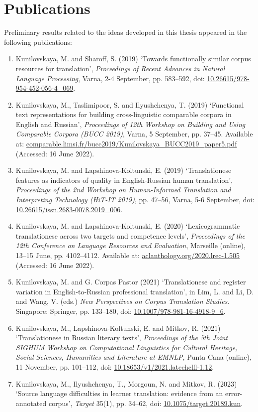 \section{\label{sec:papers}Publications}
Preliminary results related to the ideas developed in this thesis appeared in the following publications:
\begin{enumerate}\compresslist{}
	\item Kunilovskaya, M. and Sharoff, S. (2019) `Towards functionally similar corpus resources for translation', \textit{Proceedings of Recent Advances in Natural Language Processing}, Varna, 2-4 September, pp. 583--592, doi: \url{10.26615/978-954-452-056-4\_069}.
	\item Kunilovskaya, M., Taslimipoor, S. and Ilyushchenya, T. (2019) `Functional text representations for building cross-linguistic comparable corpora in English and Russian', \textit{Proceedings of 12th Workshop on Building and Using Comparable Corpora (BUCC 2019)}, Varna, 5 September, pp. 37--45. Available at: \url{comparable.limsi.fr/bucc2019/Kunilovskaya\_BUCC2019\_paper5.pdf} (Accessed: 16 June 2022).
	\item Kunilovskaya, M. and Lapshinova-Koltunski, E. (2019) `Translationese features as indicators of quality in English-Russian human translation', \textit{Proceedings of the 2nd Workshop on Human-Informed Translation and Interpreting Technology (HiT-IT 2019)}, pp. 47--56, Varna, 5-6 September, doi: \url{10.26615/issn.2683-0078.2019\_006}.
	\item Kunilovskaya, M. and Lapshinova-Koltunski, E. (2020) `Lexicogrammatic translationese across two targets and competence levels', \textit{Proceedings of the 12th Conference on Language Resources and Evaluation}, Marseille (online), 13--15 June, pp. 4102--4112. Available at: \url{aclanthology.org/2020.lrec-1.505} (Accessed: 16 June 2022).
	\item Kunilovskaya, M. and G. Corpas Pastor (2021) `Translationese and register variation in English-to-Russian professional translation', in Lim, L. and  Li, D. and Wang, V. (eds.) \textit{New Perspectives on Corpus Translation Studies}. Singapore: Springer, pp. 133--180, doi: \url{10.1007/978-981-16-4918-9\_6}. 
	\item Kunilovskaya, M., Lapshinova-Koltunski, E. and Mitkov, R. (2021) `Translationese in Russian literary texts', \textit{Proceedings of the 5th Joint SIGHUM Workshop on Computational Linguistics for Cultural Heritage, Social Sciences, Humanities and Literature at EMNLP}, Punta Cana (online), 11 November, pp. 101--112, doi: \url{10.18653/v1/2021.latechclfl-1.12}.
	\item Kunilovskaya, M., Ilyushchenya, T., Morgoun, N. and Mitkov, R. (2023) `Source language difficulties in learner translation: evidence from an error-annotated corpus', \textit{Target} 35(1), pp. 34--62, doi: \url{10.1075/target.20189.kun}.
\end{enumerate}

